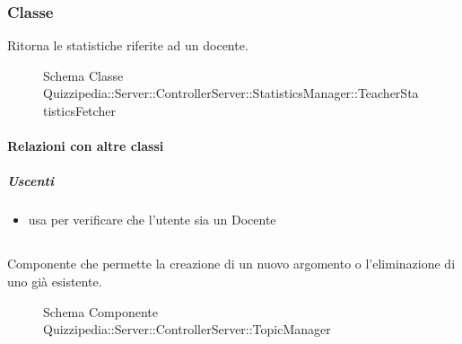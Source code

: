 \subsubsection{Classe }
Ritorna le statistiche riferite ad un docente.
\begin{figure}[H]
\centering
\noindent{}
\caption[Schema Classe TeacherStatisticsFetcher]{Schema Classe Quizzipedia::Server::ControllerServer::StatisticsManager::TeacherStatisticsFetcher}
\end{figure}
\paragraph{Relazioni con altre classi}
\subparagraph{Uscenti}
\begin{itemize}
\item usa  per verificare che l'utente sia un Docente
\end{itemize}
\subsection{}
Componente che permette la creazione di un nuovo argomento o l'eliminazione di uno già esistente.
\begin{figure}[H]
\centering
\noindent{}
\caption[Schema Componente Quizzipedia::Server::ControllerServer::TopicManager]{Schema Componente Quizzipedia::Server::ControllerServer::TopicManager}
\end{figure}
